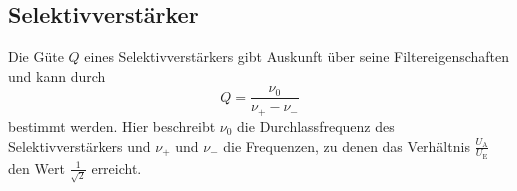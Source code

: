 \subsection{Selektivverstärker}

Die Güte $Q$ eines Selektivverstärkers gibt Auskunft über seine Filtereigenschaften und kann durch 
\begin{equation}
    Q = \frac{\nu_0}{\nu_+ - \nu_-}
    \label{eq:guetekuh}
\end{equation}
bestimmt werden.
Hier beschreibt $\nu_0$ die Durchlassfrequenz des Selektivverstärkers und $\nu_+$ und $\nu_-$ die Frequenzen, 
zu denen das Verhältnis $\frac{U_\text{A}}{U_\text{E}}$ den Wert $\frac{1}{\sqrt{2}}$ erreicht.\\

